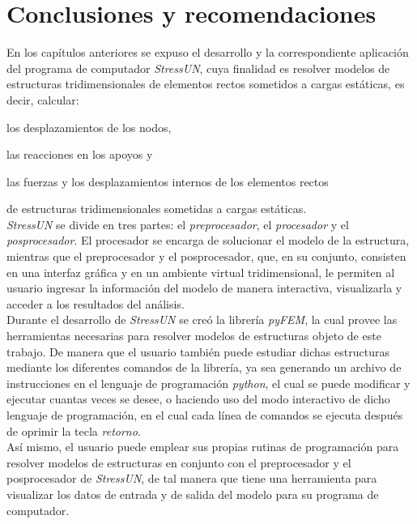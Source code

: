 \chapter{Conclusiones y recomendaciones}
En los capítulos anteriores se expuso el desarrollo y la correspondiente aplicación del programa de computador \textit{StressUN}, cuya finalidad es resolver modelos de estructuras tridimensionales de elementos rectos sometidos a cargas estáticas, es decir, calcular:
\begin{inparaenum} [$ (1) $]
    \item los desplazamientos de los nodos,
    \item las reacciones en los apoyos y 
    \item las fuerzas y los desplazamientos internos de los elementos rectos
\end{inparaenum}
de estructuras tridimensionales sometidas a cargas estáticas.\\

\textit{StressUN} se divide en tres partes: el \textit{preprocesador}, el \textit{procesador} y el \textit{posprocesador}. El procesador se encarga de solucionar el modelo de la estructura,  mientras que el preprocesador y el posprocesador, que, en su conjunto, consisten en una interfaz gráfica y en un ambiente virtual tridimensional, le permiten al usuario ingresar la información del modelo de manera interactiva, visualizarla y acceder a los resultados del análisis. \\

Durante el desarrollo de \textit{StressUN} se creó la librería \textit{pyFEM}, la cual provee las herramientas necesarias para resolver modelos de estructuras objeto de este trabajo. De manera que
el usuario también puede estudiar dichas estructuras mediante los diferentes comandos de la  librería, ya sea generando un archivo de instrucciones en el lenguaje de programación \textit{python}, el cual se puede modificar y ejecutar cuantas veces se desee, o haciendo uso del modo interactivo de dicho lenguaje de programación, en el cual cada línea de comandos se ejecuta después de oprimir la tecla \textit{retorno}. \\

Así mismo, el usuario puede emplear sus propias rutinas de programación para resolver modelos de estructuras en conjunto con el preprocesador y el posprocesador de \textit{StressUN}, de tal manera que tiene una herramienta para visualizar los datos de entrada y de salida del modelo para su programa de computador. \\

